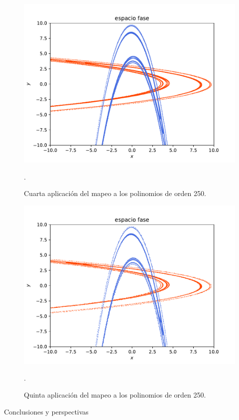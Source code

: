\documentclass[11pt]{beamer}
\theoremstyle{definition}
\begin{document}
\begin{frame}
\begin{figure}[h!]
\centering
\includegraphics[scale=0.6]{rectangulo4.pdf}
\caption{Cuarta aplicación del mapeo a los polinomios de orden 250.}.
\label{Rectangulo4}
\end{figure}
\end{frame}
\begin{frame}
\begin{figure}[H]
\centering
\includegraphics[scale=0.6]{rectangulo5.pdf}
\caption{Quinta aplicación del mapeo a los polinomios de orden 250.}.
\label{Rectangulo5}
\end{figure}
\end{frame}
\begin{frame}{Conclusiones y perspectivas}


\end{frame}
\end{document}
